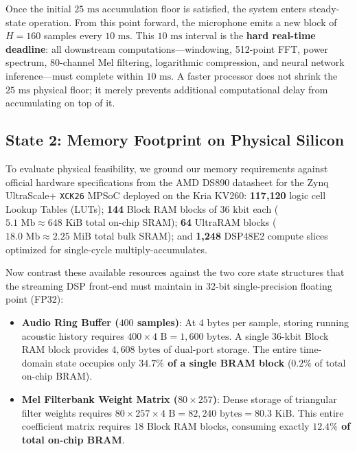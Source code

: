\documentclass[11pt,a4paper]{article}
\begin{document}
Once the initial $25\text{ ms}$ accumulation floor is satisfied, the system enters steady-state operation. From this point forward, the microphone emits a new block of $H = 160$ samples every $10\text{ ms}$. This $10\text{ ms}$ interval is the \textbf{hard real-time deadline}: all downstream computations---windowing, 512-point FFT, power spectrum, 80-channel Mel filtering, logarithmic compression, and neural network inference---must complete within $10\text{ ms}$. A faster processor does not shrink the $25\text{ ms}$ physical floor; it merely prevents additional computational delay from accumulating on top of it.

\clearpage

\vspace*{-4.5mm}
\subsection*{State 2: Memory Footprint on Physical Silicon}
\vspace{-2mm}

To evaluate physical feasibility, we ground our memory requirements against official hardware specifications from the AMD DS890 datasheet for the Zynq UltraScale+ \texttt{XCK26} MPSoC deployed on the Kria KV260:
\textbf{117,120} logic cell Lookup Tables (LUTs); \textbf{144} Block RAM blocks of $36\text{ kbit}$ each ($5.1\text{ Mb} \approx 648\text{ KiB}$ total on-chip SRAM); \textbf{64} UltraRAM blocks ($18.0\text{ Mb} \approx 2.25\text{ MiB}$ total bulk SRAM); and \textbf{1,248} DSP48E2 compute slices optimized for single-cycle multiply-accumulates.

Now contrast these available resources against the two core state structures that the streaming DSP front-end must maintain in 32-bit single-precision floating point (FP32):
\begin{itemize}\setlength{\itemsep}{0.5mm}\setlength{\parskip}{0pt}
  \item \textbf{Audio Ring Buffer ($400$ samples)}: At $4\text{ bytes}$ per sample, storing running acoustic history requires $400 \times 4\text{ B} = 1{,}600\text{ bytes}$. A single $36\text{-kbit}$ Block RAM block provides $4{,}608\text{ bytes}$ of dual-port storage. The entire time-domain state occupies only \textbf{$34.7\%$ of a single BRAM block} ($0.2\%$ of total on-chip BRAM).
  \item \textbf{Mel Filterbank Weight Matrix ($80 \times 257$)}: Dense storage of triangular filter weights requires $80 \times 257 \times 4\text{ B} = 82{,}240\text{ bytes} = 80.3\text{ KiB}$. This entire coefficient matrix requires 18 Block RAM blocks, consuming exactly \textbf{$12.4\%$ of total on-chip BRAM}.
\end{itemize}
\end{document}

